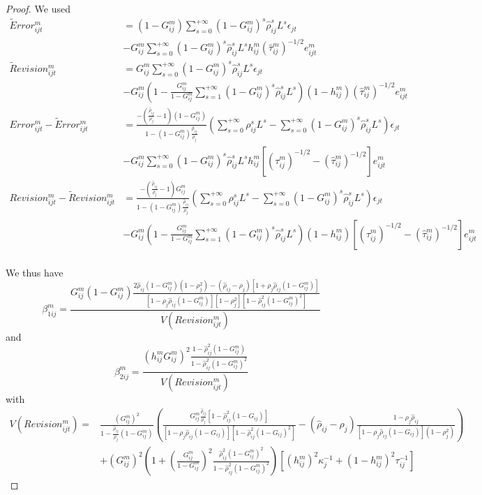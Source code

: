 \begin{proof}
We used
$$\begin{array}{ll}
\tilde Error_{ijt}^m&=(1-G_{ij}^m)\sum_{s=0}^{+\infty}(1-G_{ij}^m)^s\hat\rho_{ij}^sL^s\epsilon_{jt}\\
&-G_{ij}^m\sum_{s=0}^{+\infty}(1-G_{ij}^m)^s\hat\rho_{ij}^sL^s h_{ij}^m(\hat\tau_{ij}^m)^{-1/2}e_{ijt}^m\\
\tilde Revision_{ijt}^m&=G_{ij}^m\sum_{s=0}^{+\infty}(1-G_{ij}^m)^s\hat\rho_{ij}^sL^s\epsilon_{jt}\\
&-G_{ij}^m\left(1-\frac{G_{ij}^m}{1-G_{ij}^m}\sum_{s=1}^{+\infty}(1-G_{ij}^m)^s\hat\rho_{ij}^sL^s \right) (1-h_{ij}^m)(\hat\tau_{ij}^m)^{-1/2}e_{ijt}^m\\
Error_{ijt}^m-\tilde Error_{ijt}^m&=\frac{-\left(\frac{\hat\rho_{ij}}{\rho_j}-1\right)(1-G_{ij}^m)}{1-(1-G_{ij}^m)\frac{\hat\rho_{ij}}{\rho_j}}\left(\sum_{s=0}^{+\infty}\rho_{ij}^sL^s-\sum_{s=0}^{+\infty}(1-G_{ij}^m)^s\hat\rho_{ij}^sL^s\right)\epsilon_{jt}\\
&-G_{ij}^m\sum_{s=0}^{+\infty}(1-G_{ij}^m)^s\hat\rho_{ij}^sL^s h_{ij}^m[(\tau_{ij}^m)^{-1/2}-(\hat\tau_{ij}^m)^{-1/2}]e_{ijt}^m\\
Revision_{ijt}^m-\tilde Revision_{ijt}^m&=\frac{-\left(\frac{\hat\rho_{ij}}{\rho_j}-1\right)G_{ij}^m}{1-(1-G_{ij}^m)\frac{\hat\rho_{ij}}{\rho_j}}\left(\sum_{s=0}^{+\infty}\rho_{ij}^sL^s-\sum_{s=0}^{+\infty}(1-G_{ij}^m)^s\hat\rho_{ij}^sL^s\right)\epsilon_{jt}\\
&-G_{ij}^m\left(1-\frac{G_{ij}^m}{1-G_{ij}^m}\sum_{s=1}^{+\infty}(1-G_{ij}^m)^s\hat\rho_{ij}^sL^s \right) (1-h_{ij}^m)[(\tau_{ij}^m)^{-1/2}-(\hat\tau_{ij}^m)^{-1/2}]e_{ijt}^m\\
\end{array}$$

We thus have
$$\beta_{1ij}^m =\frac{G_{ij}^m(1-G_{ij}^m)\frac{2\hat\rho_{ij}(1-G_{ij}^m)(1-\rho_j^2)-(\hat\rho_{ij}-\rho_j)[1+\rho_j\hat\rho_{ij}(1-G_{ij}^m)]}{[1-\rho_j\hat\rho_{ij}(1-G_{ij}^m)][1-\rho_j^2][1-\hat\rho_{ij}^2(1-G_{ij}^m)^2]}}{V\left(Revision_{ijt}^m\right)}$$
and
$$\beta_{2ij}^m =\frac{(h_{ij}^mG_{ij}^m)^2\frac{1-\hat\rho_{ij}^2(1-G_{ij}^m)}{1-\hat\rho_{ij}^2(1-G_{ij}^m)^2}}{V\left(Revision_{ijt}^m\right)}$$
with
$$\begin{array}{ll}V(Revision_{ijt}^m)=&\frac{(G_{ij}^m)^2}{1-\frac{\hat\rho_{ij}}{\rho_j}(1-G_{ij}^m)}\left(\frac{G_{ij}^m\frac{\hat\rho_{ij}}{\rho_j}[1-\hat\rho_{ij}^2(1-G_{ij})]}{[1-\rho_j\hat\rho_{ij}(1-G_{ij})][1-\hat\rho_{ij}^2(1-G_{ij})^2]}-(\hat\rho_{ij}-\rho_j)\frac{1-\rho_j\hat\rho_{ij}}{[1-\rho_j\hat\rho_{ij}(1-G_{ij})](1-\rho_j^2)}\right)\\
&+(G_{ij}^m)^2\left(1+\left(\frac{G_{ij}^m}{1-G_{ij}^m}\right)^2\frac{\hat\rho_{ij}^2(1-G_{ij}^m)^2}{1-\hat\rho_{ij}^2(1-G_{ij}^m)^2}\right)[(h_{ij}^m)^2\kappa_j^{-1}+(1-h_{ij}^m)^2\tau_{ij}^{-1}]\end{array}$$


\end{proof}
